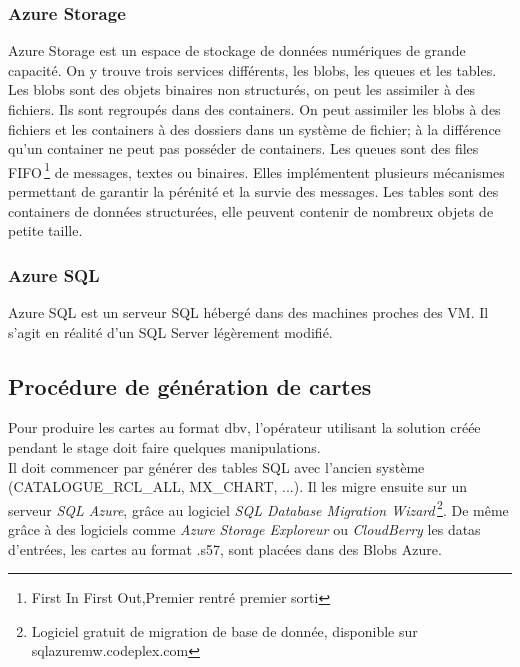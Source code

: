 \subsubsection{Azure Storage}
Azure Storage est un espace de stockage de données numériques de
grande capacité. On y trouve trois services différents, les blobs, les
queues et les tables.\\

Les blobs sont des objets binaires non structurés, on peut les
assimiler à des fichiers. Ils sont regroupés dans des containers. On
peut assimiler les blobs à des fichiers et les containers à des
dossiers dans un système de fichier; à la différence qu'un container
ne peut pas posséder de containers. Les queues sont des files
FIFO\,\footnote{{First In First Out},Premier rentré premier sorti} de
messages, textes ou binaires. Elles implémentent plusieurs mécanismes
permettant de garantir la pérénité et la survie des messages. Les
tables sont des containers de données structurées, elle peuvent
contenir de nombreux objets de petite taille.\\



\subsubsection{Azure SQL}
Azure SQL est un serveur SQL hébergé dans des machines proches des
VM. Il s'agit en réalité d'un SQL Server légèrement modifié.\\



%
%

\subsection{Procédure de génération de cartes}

Pour produire les cartes au format dbv, l'opérateur utilisant la
solution créée pendant le stage doit faire quelques manipulations. \\

Il doit commencer par générer des tables SQL avec l'ancien système
(CATALOGUE\_RCL\_ALL, MX\_CHART, ...). Il les migre ensuite sur un
serveur \textit{SQL Azure}, grâce au logiciel \textit{SQL Database
  Migration Wizard}\,\footnote{Logiciel gratuit de migration de base
  de donnée, disponible sur sqlazuremw.codeplex.com}. De même grâce à
des logiciels comme \textit{Azure Storage Exploreur} ou
\textit{CloudBerry} les datas d'entrées, les cartes au format .s57, sont
placées dans des Blobs Azure.\\

